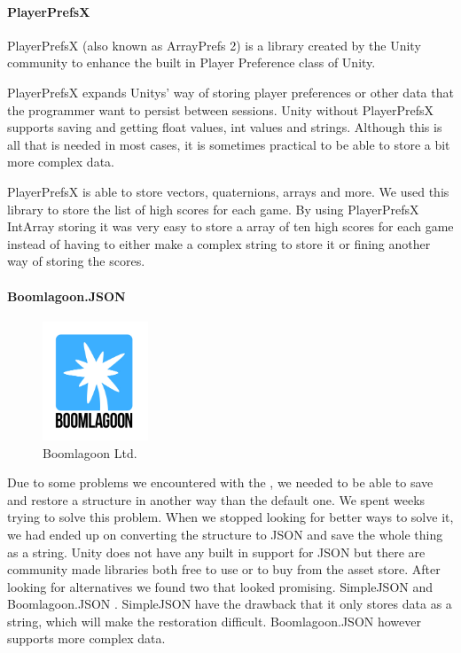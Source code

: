 \paragraph{PlayerPrefsX}
PlayerPrefsX (also known as ArrayPrefs 2)\cite{PlayerPrefsX} is a library created by the Unity community to enhance the built in Player Preference class of Unity.

PlayerPrefsX expands Unitys' way of storing player preferences or other data that the programmer want to persist between sessions.
Unity without PlayerPrefsX supports saving and getting float values, int values and strings. Although this is all that is needed in most cases, it is sometimes practical to be able to store a bit more complex data.

PlayerPrefsX is able to store vectors, quaternions, arrays and more. 
We used this library to store the list of high scores for each game. 
By using PlayerPrefsX IntArray storing it was very easy to store a array of ten high scores for each game instead of having to either make a complex string to store it or fining another way of storing the scores.

\paragraph{Boomlagoon.{JSON}}

\begin{figure}
	\capstart
	\centering
	\vspace{-20pt}
	\includegraphics[width=0.28\textwidth]{images/Boomlagoon.png}
	\vspace{-20pt}
	\caption[Boomlagoon {L}td.]{Boomlagoon {L}td.}
	\label{fig:boomlagoon}
	\vspace{-10pt}
\end{figure}

Due to some problems we encountered with the ,
we needed to be able to save and restore a structure in another way than the
default one. We spent weeks trying to solve this problem. When we stopped
looking for better ways to solve it, we had ended up on converting the 
structure to {JSON} and save the whole thing as a string.
Unity does not have any built in support for {JSON} but there are community made libraries both free to use or to buy from the asset store.
After looking for alternatives we found two that looked promising.
Simple{JSON} \cite{SimpleJSON} and Boomlagoon.{JSON} \cite{Boomlagoon.JSON}.
Simple{JSON} have the drawback that it only stores data as a string, 
which will make the restoration difficult. 
Boomlagoon.{JSON} \cite{Boomlagoon.JSON} however supports more complex data.


